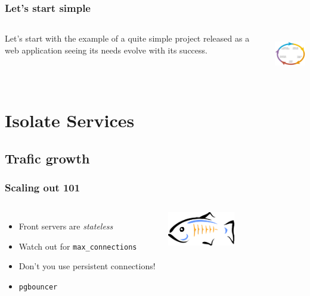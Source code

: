 \documentclass[english]{beamer}
\begin{document}
\begin{frame}[fragile]
  \frametitle{Let's start simple}

  \linebreak

\begin{columns}[c]

  Let's start with the example of a quite simple project released as a web
  application seeing its needs evolve with its success.


\includegraphics[height=5em]{development_life_cycle.png}
\end{columns}
\end{frame}

\section{Isolate Services}
\subsection{Trafic growth}
\frame{\tableofcontents[currentsubsection]}

\begin{frame}[fragile]
  \frametitle{Scaling out 101}

  \linebreak
  \linebreak

\begin{columns}[c]

  \begin{itemize}
   \item<1-> Front servers are \textit{stateless}
   \item<2-> Watch out for \texttt{max\_connections}
   \item<2-> Don't you use persistent connections!
   \item<3-> \texttt{pgbouncer}
  \end{itemize}  

\includegraphics[height=4em]{bouncer.png}
\end{columns}
\end{frame}
\end{document}
